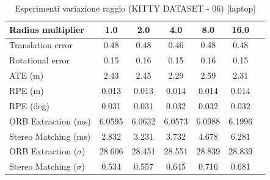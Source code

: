 \documentclass[12pt,a4paper]{report}
\begin{document}
\begin{table}[h]
    \centering
    \caption{Esperimenti variazione raggio (KITTY DATASET - 06) [laptop] }
    \begin{tabular}{lcccccc}
        \toprule
        \rowcolor{gray!20}
        Radius multiplier & 1.0 & \cellcolor{orange!40}2.0 & 4.0 & 8.0 & 16.0 \\
        \midrule
        Translation error & 0.48 & 0.48 & \cellcolor{green!20}0.46 & 0.48 & 0.48 \\
        Rotational error & \cellcolor{green!20}0.15 & 0.16 & \cellcolor{green!20}0.15 & 0.16 & \cellcolor{green!20}0.15 \\
        ATE (m)           & 2.43 & 2.45 & \cellcolor{green!20}2.29 & 2.59 & 2.31 \\
        RPE (m)           & \cellcolor{green!20}0.013 & \cellcolor{green!20}0.013 & 0.014 & 0.014 & 0.014 \\
        RPE (deg)         & \cellcolor{green!20}0.031 & \cellcolor{green!20}0.031 & 0.032 & 0.032 & 0.032 \\
        ORB Extraction (ms) & 6.0595 & 6.0632 & \cellcolor{green!20}6.0573 & 6.0988 & 6.1996 \\
        Stereo Matching (ms) & 2.832 & 3.231 & 3.732 & 4.678 & 6.281 \\
        ORB Extraction ($\sigma$) & 28.606 & \cellcolor{green!20}28.451 & 28.551 & 28.839 & 28.839 \\
        Stereo Matching ($\sigma$) & \cellcolor{green!20}0.534 & 0.557 & 0.645 & 0.716 & 0.681 \\
        \bottomrule
    \end{tabular}
\end{table}
\end{document}
